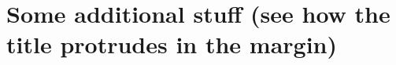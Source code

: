 \chapter[Some additional stuff]{Some additional stuff (see how the title protrudes in the margin)}


